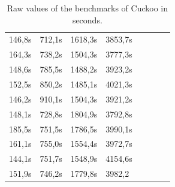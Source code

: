 \documentclass{scrartcl}
\begin{document}
\begin{table}[h]
\begin{tabular}{@{}llllllll@{}}
 \multicolumn{1}{r}{146,8s} & \multicolumn{1}{r}{712,1s} & \multicolumn{1}{r}{1618,3s} & \multicolumn{1}{r}{3853,7s} \\
 \multicolumn{1}{r}{164,3s} & \multicolumn{1}{r}{738,2s} & \multicolumn{1}{r}{1504,3s} & \multicolumn{1}{r}{3777,3s} \\
 \multicolumn{1}{r}{148,6s} & \multicolumn{1}{r}{785,5s} & \multicolumn{1}{r}{1488,2s} & \multicolumn{1}{r}{3923,2s} \\
 \multicolumn{1}{r}{152,5s} & \multicolumn{1}{r}{850,2s} & \multicolumn{1}{r}{1485,1s} & \multicolumn{1}{r}{4021,3s} \\
 \multicolumn{1}{r}{146,2s} & \multicolumn{1}{r}{910,1s} & \multicolumn{1}{r}{1504,3s} & \multicolumn{1}{r}{3921,2s} \\
 \multicolumn{1}{r}{148,1s} & \multicolumn{1}{r}{728,8s} & \multicolumn{1}{r}{1804,9s} & \multicolumn{1}{r}{3792,8s} \\
 \multicolumn{1}{r}{185,5s} & \multicolumn{1}{r}{751,5s} & \multicolumn{1}{r}{1786,5s} & \multicolumn{1}{r}{3990,1s} \\
 \multicolumn{1}{r}{161,1s} & \multicolumn{1}{r}{755,0s} & \multicolumn{1}{r}{1554,4s} & \multicolumn{1}{r}{3972,7s} \\
 \multicolumn{1}{r}{144,1s} & \multicolumn{1}{r}{751,7s} & \multicolumn{1}{r}{1548,9s} & \multicolumn{1}{r}{4154,6s} \\
 \multicolumn{1}{r}{151,9s} & \multicolumn{1}{r}{746,2s} & \multicolumn{1}{r}{1779,8s} & 3982,2 \\ \bottomrule
\end{tabular}
\caption{Raw values of the benchmarks of Cuckoo in seconds.}
\label{rawdata_cuckoo}
\end{table}
\end{document}
